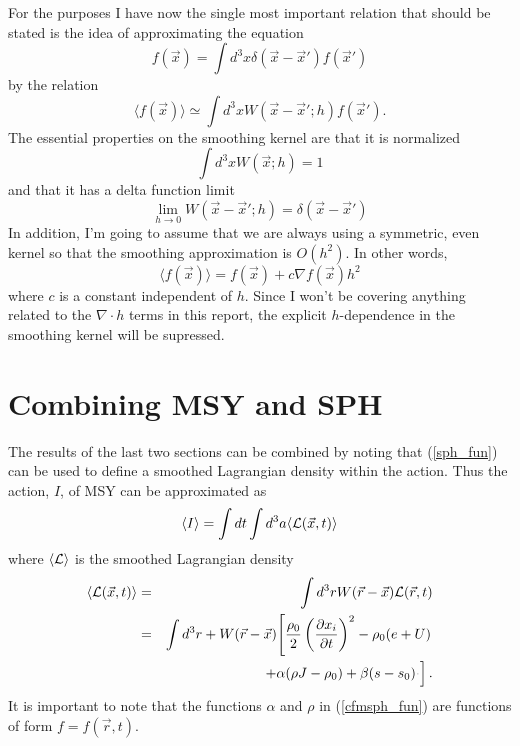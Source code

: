 For the purposes I have now the single most important relation that should be stated is the idea of approximating the equation
\begin{equation}
f({\vec x}) = \int d^3x \delta({\vec x} - {\vec x}') f({\vec x}')
\end{equation}
by the relation
\begin{equation}\label{sph_fun}
\langle f({\vec x}) \rangle  \simeq \int d^3x W({\vec x} - {\vec x}'; h) f({\vec x}').
\end{equation}
The essential properties on the smoothing kernel are that it is normalized
\begin{equation}\label{norm}
\int d^3x W({\vec x};h) = 1
\end{equation}
and that it has a delta function limit
\begin{equation}
\lim_{h \rightarrow 0} W({\vec x} - {\vec x}';h) = \delta({\vec x} - {\vec x}')
\end{equation}
In addition, I'm going to assume that we are always using a symmetric, even  kernel so that the smoothing approximation is $O(h^2)$.  In other words,
\begin{equation}
\langle f({\vec x}) \rangle = f({\vec x}) + c\nabla f({\vec x}) h^2
\end{equation}
where $c$ is a constant independent of $h$.  Since I won't be covering anything related to the $\nabla \cdot h$ terms in this report, the explicit $h$-dependence in the smoothing kernel will be supressed.
\section{Combining MSY and SPH}\label{cfmsph}

The results of the last two sections can be combined by noting that (\ref{sph_fun}) can be used to define a smoothed Lagrangian density within the action.  Thus the action, $I$, of MSY can be approximated as
\begin{equation}
\langle I \rangle = \int dt \int d^3a \langle {\cal L}({\vec x},t)\rangle
\end{equation}
where $\langle {\cal L} \rangle$ is the smoothed Lagrangian density
\begin{eqnarray}\label{cfmsph_fun}
\langle {\cal L}({\vec x},t) \rangle & = & \int d^3r W({\vec r} - {\vec x}){\cal L}({\vec r},t) \nonumber \\
& = & \int d^3r + W({\vec r} - {\vec x}) \! \left[\frac{\rho_0}{2} \left( \frac{\partial x_i}{\partial t}\right)^2 - \rho_0(e+U) \right. \nonumber \\
& & \left. + \alpha (\rho J - {\rho}_0) + \beta (s- s_0) \frac{^{}}{}\right].
\end{eqnarray}
It is important to note that the functions $\alpha$ and $\rho$ in (\ref{cfmsph_fun}) are functions of form $f = f({\vec r}, t)$.

